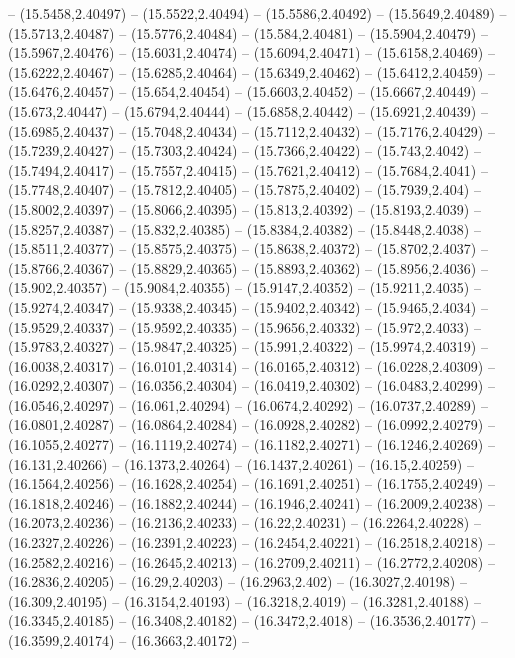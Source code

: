 {-- (15.5458,2.40497) -- (15.5522,2.40494) -- (15.5586,2.40492) -- (15.5649,2.40489) -- (15.5713,2.40487) -- (15.5776,2.40484) -- (15.584,2.40481) -- (15.5904,2.40479) -- (15.5967,2.40476) -- (15.6031,2.40474) -- (15.6094,2.40471) --
(15.6158,2.40469) -- (15.6222,2.40467) -- (15.6285,2.40464) -- (15.6349,2.40462) -- (15.6412,2.40459) -- (15.6476,2.40457) -- (15.654,2.40454) -- (15.6603,2.40452) -- (15.6667,2.40449) -- (15.673,2.40447) -- (15.6794,2.40444) -- (15.6858,2.40442) --
(15.6921,2.40439) -- (15.6985,2.40437) -- (15.7048,2.40434) -- (15.7112,2.40432) -- (15.7176,2.40429) -- (15.7239,2.40427) -- (15.7303,2.40424) -- (15.7366,2.40422) -- (15.743,2.4042) -- (15.7494,2.40417) -- (15.7557,2.40415) -- (15.7621,2.40412) --
(15.7684,2.4041) -- (15.7748,2.40407) -- (15.7812,2.40405) -- (15.7875,2.40402) -- (15.7939,2.404) -- (15.8002,2.40397) -- (15.8066,2.40395) -- (15.813,2.40392) -- (15.8193,2.4039) -- (15.8257,2.40387) -- (15.832,2.40385) -- (15.8384,2.40382) --
(15.8448,2.4038) -- (15.8511,2.40377) -- (15.8575,2.40375) -- (15.8638,2.40372) -- (15.8702,2.4037) -- (15.8766,2.40367) -- (15.8829,2.40365) -- (15.8893,2.40362) -- (15.8956,2.4036) -- (15.902,2.40357) -- (15.9084,2.40355) -- (15.9147,2.40352) --
(15.9211,2.4035) -- (15.9274,2.40347) -- (15.9338,2.40345) -- (15.9402,2.40342) -- (15.9465,2.4034) -- (15.9529,2.40337) -- (15.9592,2.40335) -- (15.9656,2.40332) -- (15.972,2.4033) -- (15.9783,2.40327) -- (15.9847,2.40325) -- (15.991,2.40322) --
(15.9974,2.40319) -- (16.0038,2.40317) -- (16.0101,2.40314) -- (16.0165,2.40312) -- (16.0228,2.40309) -- (16.0292,2.40307) -- (16.0356,2.40304) -- (16.0419,2.40302) -- (16.0483,2.40299) -- (16.0546,2.40297) -- (16.061,2.40294) -- (16.0674,2.40292)
-- (16.0737,2.40289) -- (16.0801,2.40287) -- (16.0864,2.40284) -- (16.0928,2.40282) -- (16.0992,2.40279) -- (16.1055,2.40277) -- (16.1119,2.40274) -- (16.1182,2.40271) -- (16.1246,2.40269) -- (16.131,2.40266) -- (16.1373,2.40264) --
(16.1437,2.40261) -- (16.15,2.40259) -- (16.1564,2.40256) -- (16.1628,2.40254) -- (16.1691,2.40251) -- (16.1755,2.40249) -- (16.1818,2.40246) -- (16.1882,2.40244) -- (16.1946,2.40241) -- (16.2009,2.40238) -- (16.2073,2.40236) -- (16.2136,2.40233) --
(16.22,2.40231) -- (16.2264,2.40228) -- (16.2327,2.40226) -- (16.2391,2.40223) -- (16.2454,2.40221) -- (16.2518,2.40218) -- (16.2582,2.40216) -- (16.2645,2.40213) -- (16.2709,2.40211) -- (16.2772,2.40208) -- (16.2836,2.40205) -- (16.29,2.40203) --
(16.2963,2.402) -- (16.3027,2.40198) -- (16.309,2.40195) -- (16.3154,2.40193) -- (16.3218,2.4019) -- (16.3281,2.40188) -- (16.3345,2.40185) -- (16.3408,2.40182) -- (16.3472,2.4018) -- (16.3536,2.40177) -- (16.3599,2.40174) -- (16.3663,2.40172) --
}
